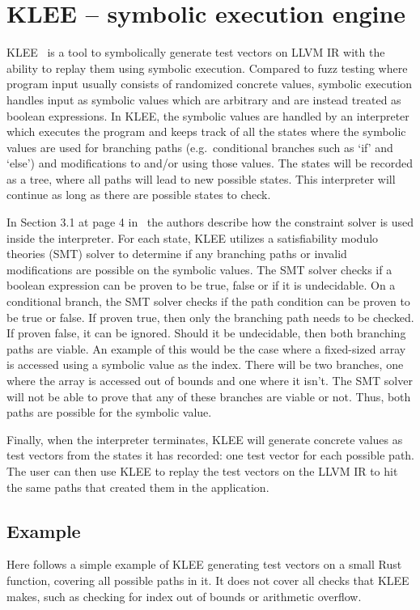 \section{KLEE -- symbolic execution engine}
KLEE~\cite{kleepaper} is a tool to symbolically generate test vectors on LLVM IR with the
ability to replay them using symbolic execution. Compared to fuzz testing
where program input usually consists of randomized concrete values, symbolic
execution handles input as symbolic values which are arbitrary and are instead
treated as boolean expressions. In KLEE, the symbolic values are handled by an
interpreter which executes the program and keeps track of all the states where
the symbolic values are used for branching paths (e.g.\ conditional branches
such as `if' and `else') and modifications to and/or using those values. The
states will be recorded as a tree, where all paths will lead to new possible
states.  This interpreter will continue as long as there are possible states to
check.

In Section 3.1 at page 4 in~\cite{kleepaper} the authors describe how the
constraint solver is used inside the interpreter. For each state, KLEE utilizes
a satisfiability modulo theories (SMT) solver to determine if any branching
paths or invalid modifications are possible on the symbolic values. The SMT
solver checks if a boolean expression can be proven to be true, false or if it
is undecidable. On a conditional branch, the SMT solver checks if the path
condition can be proven to be true or false. If proven true, then only the
branching path needs to be checked. If proven false, it can be ignored. Should
it be undecidable, then both branching paths are viable. An example of this
would be the case where a fixed-sized array is accessed using a symbolic value
as the index. There will be two branches, one where the array is accessed out
of bounds and one where it isn't. The SMT solver will not be able to prove that
any of these branches are viable or not. Thus, both paths are possible for the
symbolic value.

Finally, when the interpreter terminates, KLEE will generate concrete values as
test vectors from the states it has recorded: one test vector for each possible
path. The user can then use KLEE to replay the test vectors on the LLVM IR to hit
the same paths that created them in the application.

\subsection{Example}
Here follows a simple example of KLEE generating test vectors on a small Rust
function, covering all possible paths in it. It does not cover all checks that
KLEE makes, such as checking for index out of bounds or arithmetic overflow.

